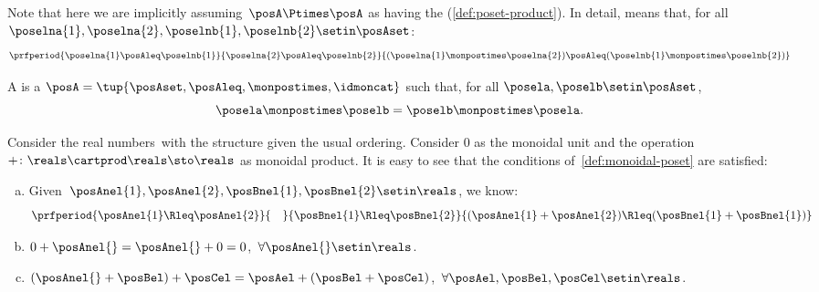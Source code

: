 Note that here we are implicitly assuming~$\posA \Ptimes \posA$ as having the  (\cref{def:poset-product}).
In detail,  means that, for all~$\poselna{1}, \poselna{2}, \poselnb{1}, \poselnb{2} \setin \posAset$:
\begin{equation}
    \prfperiod{
        \poselna{1} \posAleq \poselnb{1}}{\poselna{2} \posAleq \poselnb{2}}{ (\poselna{1} \monpostimes \poselna{2}) \posAleq (\poselnb{1} \monpostimes \poselnb{2})}
\end{equation}

\begin{ctdefinition}
    \label{def:sym-monoidal-poset}
    A  is a  $\posA=\tup{\posAset, \posAleq, {\monpostimes}, \idmoncat}$ such that, for all $\posela, \poselb \setin \posAset$,
    \begin{equation}
        \posela \monpostimes \poselb = \poselb \monpostimes \posela.
    \end{equation}
\end{ctdefinition}

\begin{example}
    \label{ex:monoidal-pos-reals}
    Consider the real numbers~\reals with the  structure given the usual ordering.
    Consider 0 as the monoidal unit and the operation~$+\colon \reals\cartprod \reals\sto \reals$ as monoidal product.
    It is easy to see that the conditions of~\cref{def:monoidal-poset} are satisfied:
    \begin{enumerate}[(a)]
        \item Given~$\posAnel{1},\posAnel{2},\posBnel{1},\posBnel{2}\setin \reals$, we know:
              \begin{equation}
                  \prfperiod{
                      \posAnel{1}\Rleq \posAnel{2}
                  }{\quad}{
                      \posBnel{1}\Rleq \posBnel{2}
                  }{
                      (\posAnel{1}+\posAnel{2}) \Rleq (\posBnel{1}+\posBnel{1})
                  }
              \end{equation}
        \item $0+\posAnel{}=\posAnel{}+0=0$,~$\forall \posAnel{}\setin \reals$.
        \item $(\posAnel{}+\posBel)+\posCel=\posAel+(\posBel+\posCel)$,~$\forall \posAel,\posBel,\posCel\setin \reals$.
    \end{enumerate}
\end{example}

